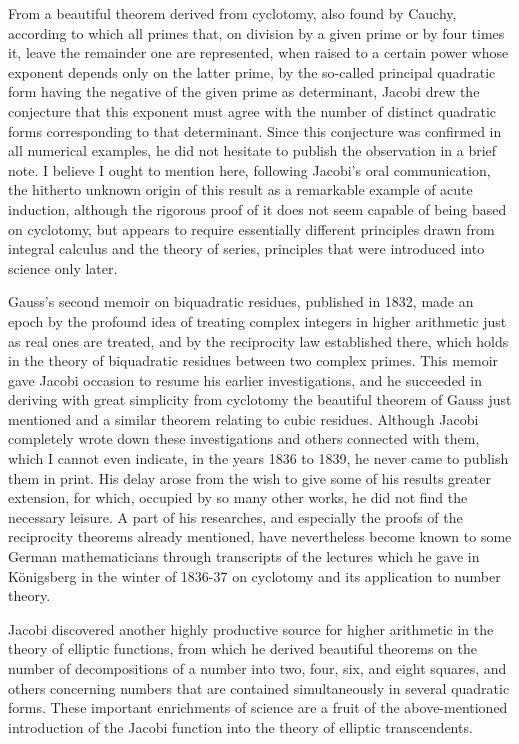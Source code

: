 \documentclass[11pt]{article}
\begin{document}
From a beautiful theorem derived from cyclotomy, also found by Cauchy, according to which all primes that, on division by a given prime or by four times it, leave the remainder one are represented, when raised to a certain power whose exponent depends only on the latter prime, by the so-called principal quadratic form having the negative of the given prime as determinant, Jacobi drew the conjecture that this exponent must agree with the number of distinct quadratic forms corresponding to that determinant. Since this conjecture was confirmed in all numerical examples, he did not hesitate to publish the observation in a brief note. I believe I ought to mention here, following Jacobi's oral communication, the hitherto unknown origin of this result as a remarkable example of acute induction, although the rigorous proof of it does not seem capable of being based on cyclotomy, but appears to require essentially different principles drawn from integral calculus and the theory of series, principles that were introduced into science only later.

Gauss's second memoir on biquadratic residues, published in 1832, made an epoch by the profound idea of treating complex integers in higher arithmetic just as real ones are treated, and by the reciprocity law established there, which holds in the theory of biquadratic residues between two complex primes. This memoir gave Jacobi occasion to resume his earlier investigations, and he succeeded in deriving with great simplicity from cyclotomy the beautiful theorem of Gauss just mentioned and a similar theorem relating to cubic residues. Although Jacobi completely wrote down these investigations and others connected with them, which I cannot even indicate, in the years 1836 to 1839, he never came to publish them in print. His delay arose from the wish to give some of his results greater extension, for which, occupied by so many other works, he did not find the necessary leisure. A part of his researches, and especially the proofs of the reciprocity theorems already mentioned, have nevertheless become known to some German mathematicians through transcripts of the lectures which he gave in Königsberg in the winter of 1836-37 on cyclotomy and its application to number theory.

Jacobi discovered another highly productive source for higher arithmetic in the theory of elliptic functions, from which he derived beautiful theorems on the number of decompositions of a number into two, four, six, and eight squares, and others concerning numbers that are contained simultaneously in several quadratic forms. These important enrichments of science are a fruit of the above-mentioned introduction of the Jacobi function into the theory of elliptic transcendents.
\end{document}
